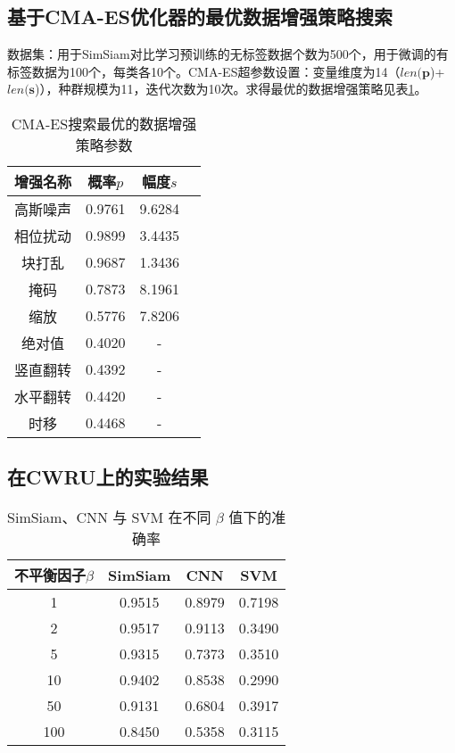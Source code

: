 \documentclass[master]{thesis-uestc}
\begin{document}
\subsection{基于CMA-ES优化器的最优数据增强策略搜索}
数据集：用于SimSiam对比学习预训练的无标签数据个数为500个，用于微调的有标签数据为100个，每类各10个。CMA-ES超参数设置：变量维度为14（\(len(\mathbf{p}\))+\(len(\mathbf{s}\))），种群规模为11，迭代次数为10次。求得最优的数据增强策略见表\ref{CMA-ES_solution}。
\begin{table}[h]
    \caption{CMA-ES搜索最优的数据增强策略参数}
    \begin{tabular}{cccc}
    \toprule
    增强名称 & 概率$p$ & 幅度$s$\\
    \midrule
    高斯噪声 & 0.9761 & 9.6284 \\
    相位扰动 & 0.9899 & 3.4435 \\
    块打乱  & 0.9687 & 1.3436\\
    掩码 & 0.7873 & 8.1961\\
    缩放 & 0.5776 & 7.8206\\
    绝对值 & 0.4020 & \--\\
    竖直翻转 & 0.4392 & \--\\
    水平翻转 & 0.4420 & \--\\
    时移 & 0.4468 & \--\\
    \bottomrule
    \end{tabular}
    \label{CMA-ES_solution}
    \end{table}

\subsection{在CWRU上的实验结果}
\begin{table}[h]
    \caption{SimSiam、CNN 与 SVM 在不同 $\beta$ 值下的准确率}
    \centering
    \begin{tabular}{cccc}
    \toprule
    不平衡因子$\beta$  & SimSiam & CNN & SVM \\
    \midrule
    1   & 0.9515  & 0.8979 & 0.7198 \\
    2   & 0.9517  & 0.9113 & 0.3490 \\
    5   & 0.9315  & 0.7373 & 0.3510 \\
    10  & 0.9402  & 0.8538 & 0.2990 \\
    50  & 0.9131  & 0.6804 & 0.3917 \\
    100 & 0.8450  & 0.5358 & 0.3115 \\
    \bottomrule
    \end{tabular}
    \label{simsiam_cnn_svm_results}
\end{table}
\end{document}
